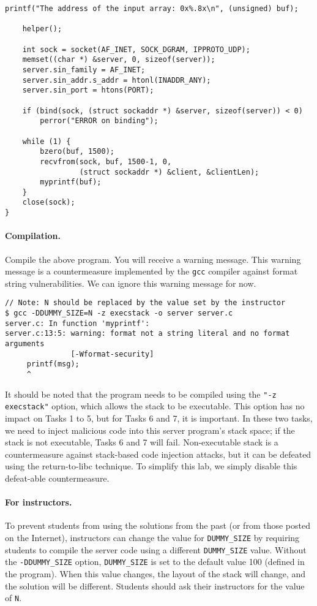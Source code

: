 \begin{lstlisting}[label=format:code:server, caption={The vulnerable server program
             \texttt{server.c} (can be downloaded from the lab's website)}]
    printf("The address of the input array: 0x%.8x\n", (unsigned) buf);

    helper();

    int sock = socket(AF_INET, SOCK_DGRAM, IPPROTO_UDP);
    memset((char *) &server, 0, sizeof(server));
    server.sin_family = AF_INET;
    server.sin_addr.s_addr = htonl(INADDR_ANY);
    server.sin_port = htons(PORT);

    if (bind(sock, (struct sockaddr *) &server, sizeof(server)) < 0)
        perror("ERROR on binding");

    while (1) {
        bzero(buf, 1500);
        recvfrom(sock, buf, 1500-1, 0,
                 (struct sockaddr *) &client, &clientLen);
        myprintf(buf);
    }
    close(sock);
}
\end{lstlisting}

\paragraph{Compilation.} Compile the above program. You will receive a
warning message. This warning message is a countermeasure implemented by
the \texttt{gcc} compiler against format string vulnerabilities. We can
ignore this warning message for now. 


\begin{lstlisting}
// Note: N should be replaced by the value set by the instructor
$ gcc -DDUMMY_SIZE=N -z execstack -o server server.c
server.c: In function 'myprintf':
server.c:13:5: warning: format not a string literal and no format arguments 
               [-Wformat-security]
     printf(msg);
     ^
\end{lstlisting}

It should be noted that the program needs to be compiled using 
the \texttt{"-z execstack"} option, which allows the stack to be 
executable. This option has no impact on Tasks 1 to 5, but for 
Tasks 6 and 7, it is important. In these 
two tasks, we need to inject malicious code into this server program's stack space; 
if the  stack is not executable, Tasks 6 and 7 will fail. 
Non-executable stack is a countermeasure against stack-based 
code injection attacks, but 
it can be defeated using the return-to-libc technique. To simplify 
this lab, we simply disable this defeat-able countermeasure. 


\paragraph{For instructors.} 
To prevent students from using the solutions from the past (or from those 
posted on the Internet), instructors can change the 
value for \texttt{DUMMY\_SIZE} by requiring students to compile the 
server code using a different \texttt{DUMMY\_SIZE} value. 
Without the \texttt{-DDUMMY\_SIZE}  
option, \texttt{DUMMY\_SIZE} is set to the default value 100 (defined
in the program). 
When this value changes, the layout of the stack 
will change, and the solution will be different. 
Students should ask their instructors for
the value of \texttt{N}.




